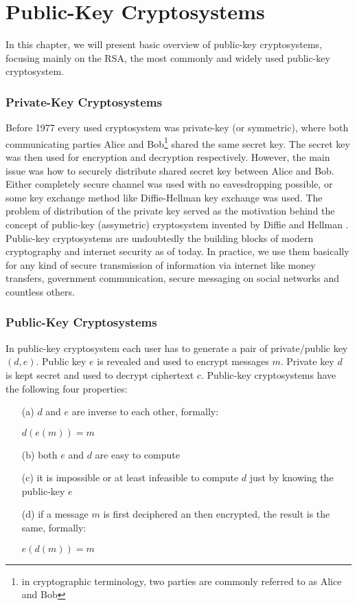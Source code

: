 \chapter{Public-Key Cryptosystems}

In this chapter, we will present basic overview of public-key cryptosystems, focusing mainly on the RSA, the most commonly and widely used public-key cryptosystem. 

\subsection*{Private-Key Cryptosystems}

Before 1977 every used cryptosystem was private-key (or symmetric), where both communicating parties Alice and Bob\footnote{in cryptographic terminology, two parties are commonly referred to as Alice and Bob} shared the same secret key. The secret key was then used for encryption and decryption respectively. However, the main issue was how to securely distribute shared secret key between Alice and Bob. Either completely secure channel was used with no eavesdropping possible, or some key exchange method like Diffie-Hellman key exchange\cite{diffie_hellman} was used. The problem of distribution of the private key served as the motivation behind the concept of public-key (assymetric) cryptosystem invented by Diffie and Hellman \cite{diffie_hellman}. Public-key cryptosystems are undoubtedly the building blocks of modern cryptography and internet security as of today. In practice, we use them basically for any kind of secure transmission of information via internet like money transfers, government communication, secure messaging on social networks and countless others.

\subsection*{Public-Key Cryptosystems}

In public-key cryptosystem each user has to generate a pair of private/public key $(d,e)$. Public key $e$ is revealed and used to encrypt messages $m$. Private key $d$ is kept secret and used to decrypt ciphertext $c$. Public-key cryptosystems have the following four properties:

\begin{itemize}

	\item[(a)] $d$ and $e$ are inverse to each other, formally:

$d(e(m)) = m$

	\item[(b)] both $e$ and $d$ are easy to compute

	\item[(c)] it is impossible or at least infeasible to compute $d$ just by knowing the public-key $e$

	\item[(d)] if a message $m$ is first deciphered an then encrypted, the result is the same, formally:
    
$e(d(m)) = m$

\end{itemize}

